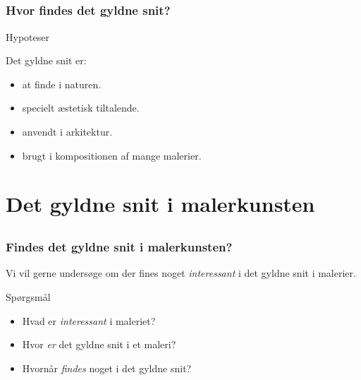 \documentclass{beamer}
\begin{document}
\subsection*{}
\begin{frame}

    \frametitle{Hvor findes det gyldne snit?}

    \begin{block}{Hypoteser}

        Det gyldne snit er:

        \begin{itemize}
            \item <1> at finde i naturen.
            \item <1> specielt æstetisk tiltalende.
            \item <1> anvendt i arkitektur.
            \item <1-2> brugt i kompositionen af mange malerier.
        \end{itemize}

    \end{block}


\end{frame}

\section{Det gyldne snit i malerkunsten}

\subsection*{}
\begin{frame}

    \frametitle{Findes det gyldne snit i malerkunsten?}

    Vi vil gerne undersøge om der fines noget \emph{interessant} i det gyldne snit i malerier.

    \hspace{8em}

    \begin{block}{Spørgsmål}

        \begin{itemize}
            \item Hvad er \emph{interessant} i maleriet?
            \item Hvor \emph{er} det gyldne snit i et maleri?
            \item Hvornår \emph{findes} noget i det gyldne snit?
        \end{itemize}

    \end{block}

\end{frame}
\end{document}
